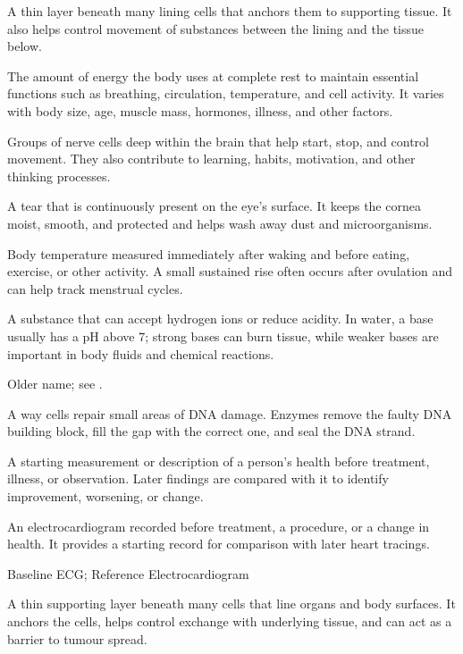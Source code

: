  A thin layer beneath many lining cells that anchors them to supporting tissue. It also helps control movement of substances between the lining and the tissue below.

 The amount of energy the body uses at complete rest to maintain essential functions such as breathing, circulation, temperature, and cell activity. It varies with body size, age, muscle mass, hormones, illness, and other factors.

 Groups of nerve cells deep within the brain that help start, stop, and control movement. They also contribute to learning, habits, motivation, and other thinking processes.

 A tear that is continuously present on the eye's surface. It keeps the cornea moist, smooth, and protected and helps wash away dust and microorganisms.

 Body temperature measured immediately after waking and before eating, exercise, or other activity. A small sustained rise often occurs after ovulation and can help track menstrual cycles.

 A substance that can accept hydrogen ions or reduce acidity. In water, a base usually has a pH above 7; strong bases can burn tissue, while weaker bases are important in body fluids and chemical reactions.

 Older name; see .

 A way cells repair small areas of DNA damage. Enzymes remove the faulty DNA building block, fill the gap with the correct one, and seal the DNA strand.

 A starting measurement or description of a person's health before treatment, illness, or observation. Later findings are compared with it to identify improvement, worsening, or change.

 An electrocardiogram recorded before treatment, a procedure, or a change in health. It provides a starting record for comparison with later heart tracings.

\synonyms
Baseline ECG; Reference Electrocardiogram

 A thin supporting layer beneath many cells that line organs and body surfaces. It anchors the cells, helps control exchange with underlying tissue, and can act as a barrier to tumour spread.

